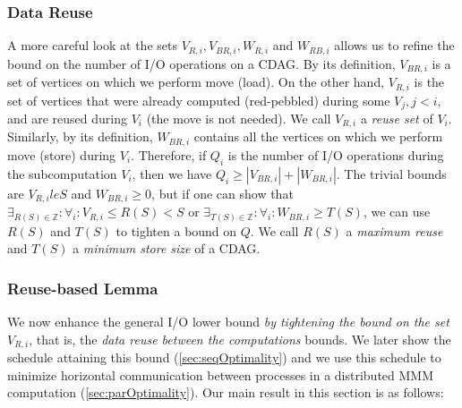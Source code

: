 \subsubsection{Data Reuse}
\label{sec:datareuse}

A more careful look at the sets $V_{R,i}, V_{BR,i}, W_{R,i}$ and $W_{RB,i}$ 
allows us to 
refine the bound on the number of I/O operations on a CDAG. By its 
definition,  
$V_{BR,i}$ is a set of vertices on which we perform move  (load).  
On the other hand, $V_{R,i}$ is the set of vertices that were already computed 
(red-pebbled) during some $V_j, j < i$, and are reused during $V_i$ (the move 
 is not needed).  
We call $V_{R,i}$ a \emph{reuse set} of $V_i$. Similarly, by its definition, 
$W_{BR,i}$ contains all the vertices on which we perform move  
(store)  during $V_i$.
Therefore, if $Q_i$ is the number of I/O 
operations during the subcomputation $V_i$, then we have $ Q_i \ge |V_{BR,i}| 
+  |W_{BR,i}|$.
The trivial bounds are 
$V_{R,i} le S$ and $W_{BR,i} \ge 0$, but if one can show that $\exists_{R(S) 
	\in \mathbb{Z}}: 
\forall_i: V_{R,i} \le R(S) < S$ or $\exists_{T(S) \in \mathbb{Z}}: 
\forall_i: W_{BR,i} \ge T(S)$, we can use $R(S)$ and $T(S)$ to tighten a bound 
on 
$Q$. We call $R(S)$ a \emph{maximum reuse} and $T(S)$ a \emph{minimum store 
	size} of 
a CDAG.


\subsubsection{Reuse-based Lemma}

%

We now enhance the general I/O lower bound \emph{by tightening the bound on the
	set $V_{R,i}$}, that is, the \emph{data reuse between the computations}
%
bounds. We later show the schedule attaining this bound
(\cref{sec:seqOptimality}) and we use this schedule to minimize horizontal
communication between processes in a distributed MMM computation
(\cref{sec:parOptimality}). 
%
%
%
%
%
Our main result in this section is as follows:

